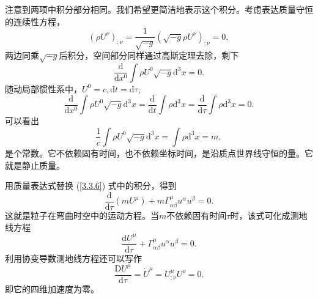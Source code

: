 \documentclass[11pt, a4paper, oneside, onecolumn]{ctexart}
\numberwithin{equation}{subsection}
\begin{document}
注意到两项中积分部分相同。我们希望更简洁地表示这个积分。考虑表达质量守恒的连续性方程，
\begin{equation}
\left(\rho U^{\nu}\right)_{;\nu}=\frac{1}{\sqrt{-g}}\left(\sqrt{-g}\rho U^{\nu}\right)_{;\nu}=0,
\end{equation}
两边同乘$\sqrt{-g}$后积分，空间部分同样通过高斯定理去除，剩下
\begin{equation}
\frac{\mathrm{d}}{\mathrm{d}x^{0}}\int\rho U^{0}\sqrt{-g}\mathrm{d}^{3}x=0.
\end{equation}
随动局部惯性系中，$U^{0}=c,\mathrm{d}t=\mathrm{d}\tau$,
\begin{equation}
\frac{\mathrm{d}}{\mathrm{d}x^{0}}\int\rho U^{0}\sqrt{-g}\mathrm{d}^{3}x=\frac{\mathrm{d}}{\mathrm{d}t}\int\rho\mathrm{d}^{3}x=\frac{\mathrm{d}}{\mathrm{d}\tau}\int\rho\mathrm{d}^{3}x=0.
\end{equation}
可以看出
\begin{equation}
\frac{1}{c}\int\rho U^{0}\sqrt{-g}\mathrm{d}^{3}x=\int\rho\mathrm{d}^{3}x=m,
\end{equation}
是个常数。它不依赖固有时间，也不依赖坐标时间，是沿质点世界线守恒的量。它就是静止质量。

用质量表达式替换 (\ref{3.3.6}) 式中的积分，得到
\begin{equation}
\frac{\mathrm{d}}{\mathrm{d}\tau}\left(mU^{\mu}\right)+m\Gamma_{\alpha\beta}^{\mu}u^{\alpha}u^{\beta}=0.\label{3.3.11}
\end{equation}
这就是粒子在弯曲时空中的运动方程。当$m$不依赖固有时间$\tau$时，该式可化成测地线方程
\begin{equation}
\frac{\mathrm{d}U^{\mu}}{\mathrm{d}\tau}+\Gamma_{\alpha\beta}^{\mu}u^{\alpha}u^{\beta}=0.
\end{equation}
利用协变导数测地线方程还可以写作
\begin{equation}
\dfrac{\mathrm{D}U^{\mu}}{\mathrm{d}\tau}=\dot{U}^{\mu}=U^{\mu}_{;\nu}U^{\nu}=0.\label{3.3.13}
\end{equation}
即它的四维加速度为零。
\end{document}
